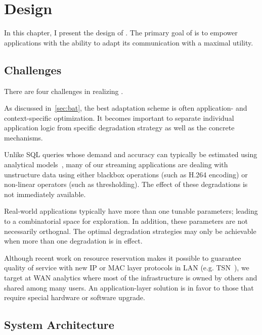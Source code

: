 \chapter{\sysname{} Design}
\label{sec:system-design}

In this chapter, I present the design of \sysname{}. The primary goal of
\sysname{} is to empower applications with the ability to adapt its
communication with a maximal utility.

\section{Challenges}
\label{sec:challenges}

\noindent There are four challenges in realizing \sysname{}.

 As discussed in~\autoref{sec:bat}, the
best adaptation scheme is often application- and context-specific
optimization. It becomes important to separate individual application logic from
specific degradation strategy as well as the concrete mechanisms.

 Unlike SQL queries whose demand and accuracy
can typically be estimated using analytical models~\cite{cormode2012synopses},
many of our streaming applications are dealing with unstructure data using
either blackbox operations (such as H.264 encoding) or non-linear operators
(such as thresholding). The effect of these degradations is not immediately
available.

 Real-world applications typically have
more than one tunable parameters; leading to a combinatorial space for
exploration. In addition, these parameters are not necessarily orthognal.  The
optimal degradation strategies may only be achievable when more than one
degradation is in effect.

 Although recent work on
resource reservation makes it possible to guarantee quality of service with new
IP or MAC layer protocols in LAN (e.g. TSN~\cite{johas2013heterogeneous}), we
target at WAN analytics where most of the infrastructure is owned by others and
shared among many users. An application-layer solution is in favor to those that
require special hardware or software upgrade.

\section{System Architecture}
\label{sec:architecture}

